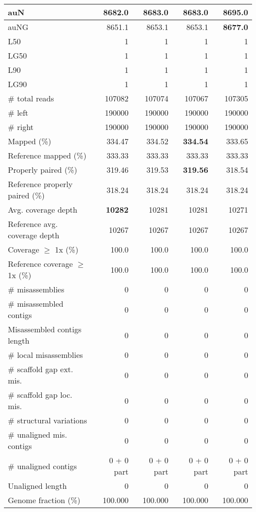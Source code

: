\documentclass[12pt,a4paper]{article}
\begin{document}
\begin{table}[ht]
\begin{center}
\begin{tabular}{|l*{4}{|r}|}
auN & 8682.0 & 8683.0 & 8683.0 & {\bf 8695.0} \\ \hline
auNG & 8651.1 & 8653.1 & 8653.1 & {\bf 8677.0} \\ \hline
L50 & 1 & 1 & 1 & 1 \\ \hline
LG50 & 1 & 1 & 1 & 1 \\ \hline
L90 & 1 & 1 & 1 & 1 \\ \hline
LG90 & 1 & 1 & 1 & 1 \\ \hline
\# total reads & 107082 & 107074 & 107067 & 107305 \\ \hline
\# left & 190000 & 190000 & 190000 & 190000 \\ \hline
\# right & 190000 & 190000 & 190000 & 190000 \\ \hline
Mapped (\%) & 334.47 & 334.52 & {\bf 334.54} & 333.65 \\ \hline
Reference mapped (\%) & 333.33 & 333.33 & 333.33 & 333.33 \\ \hline
Properly paired (\%) & 319.46 & 319.53 & {\bf 319.56} & 318.54 \\ \hline
Reference properly paired (\%) & 318.24 & 318.24 & 318.24 & 318.24 \\ \hline
Avg. coverage depth & {\bf 10282} & 10281 & 10281 & 10271 \\ \hline
Reference avg. coverage depth & 10267 & 10267 & 10267 & 10267 \\ \hline
Coverage $\geq$ 1x (\%) & 100.0 & 100.0 & 100.0 & 100.0 \\ \hline
Reference coverage $\geq$ 1x (\%) & 100.0 & 100.0 & 100.0 & 100.0 \\ \hline
\# misassemblies & 0 & 0 & 0 & 0 \\ \hline
\# misassembled contigs & 0 & 0 & 0 & 0 \\ \hline
Misassembled contigs length & 0 & 0 & 0 & 0 \\ \hline
\# local misassemblies & 0 & 0 & 0 & 0 \\ \hline
\# scaffold gap ext. mis. & 0 & 0 & 0 & 0 \\ \hline
\# scaffold gap loc. mis. & 0 & 0 & 0 & 0 \\ \hline
\# structural variations & 0 & 0 & 0 & 0 \\ \hline
\# unaligned mis. contigs & 0 & 0 & 0 & 0 \\ \hline
\# unaligned contigs & 0 + 0 part & 0 + 0 part & 0 + 0 part & 0 + 0 part \\ \hline
Unaligned length & 0 & 0 & 0 & 0 \\ \hline
Genome fraction (\%) & 100.000 & 100.000 & 100.000 & 100.000 \\ \hline

\end{tabular}
\end{center}
\end{table}
\end{document}
